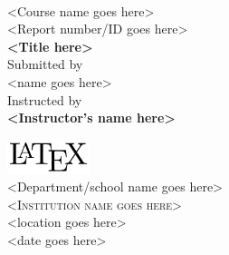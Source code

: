 \begin{titlepage}

\begin{center}

\textup{\small {\bf <Course code goes here>} \\ <Course name goes here> \\ <Report number/ID goes here>}\\[0.2in]

\Large \textbf {<Title here>}\\[0.5in]

\normalsize Submitted by \\
<name goes here>\\

\vspace{.3in}
Instructed by\\
{\textbf{<Instructor's name here>}}\\[0.2in]

\vfill

\includegraphics[width=0.18\textwidth]{./Images/LaTeX_logo.png}\\[0.1in]
\Large{<Department/school name goes here>}\\
\normalsize
\textsc{<Institution name goes here>}\\
<location goes here> \\
\vspace{0.2cm}
<date goes here>

\end{center}

\end{titlepage}
